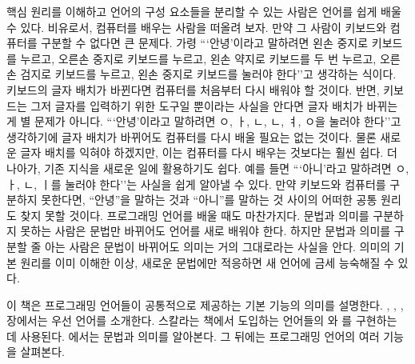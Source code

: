 핵심 원리를 이해하고 언어의 구성 요소들을 분리할 수 있는 사람은 언어를 쉽게 배울
수 있다. 비유로서, 컴퓨터를 배우는 사람을 떠올려 보자. 만약 그 사람이 키보드와
컴퓨터를 구분할 수 없다면 큰 문제다. 가령 ```안녕'이라고 말하려면 왼손 중지로
키보드를 누르고, 오른손 중지로 키보드를 누르고, 왼손 약지로 키보드를 두 번
누르고, 오른손 검지로 키보드를 누르고, 왼손 중지로 키보드를 눌러야 한다''고
생각하는 식이다. 키보드의 글자 배치가 바뀐다면 컴퓨터를 처음부터 다시 배워야 할
것이다. 반면, 키보드는 그저 글자를 입력하기 위한 도구일 뿐이라는 사실을 안다면
글자 배치가 바뀌는 게 별 문제가 아니다. ```안녕'이라고 말하려면 ㅇ, ㅏ, ㄴ, ㄴ,
ㅕ, ㅇ을 눌러야 한다''고 생각하기에 글자 배치가 바뀌어도 컴퓨터를 다시 배울
필요는 없는 것이다. 물론 새로운 글자 배치를 익혀야 하겠지만, 이는 컴퓨터를 다시
배우는 것보다는 훨씬 쉽다. 더 나아가, 기존 지식을 새로운 일에 활용하기도 쉽다.
예를 들면 ```아니'라고 말하려면 ㅇ, ㅏ, ㄴ, ㅣ를 눌러야 한다''는 사실을 쉽게
알아낼 수 있다. 만약 키보드와 컴퓨터를 구분하지 못한다면, ``안녕''을 말하는 것과
``아니''를 말하는 것 사이의 어떠한 공통 원리도 찾지 못할 것이다. 프로그래밍 언어를
배울 때도 마찬가지다. 문법과 의미를 구분하지 못하는 사람은 문법만 바뀌어도
언어를 새로 배워야 한다. 하지만 문법과 의미를 구분할 줄 아는 사람은 문법이
바뀌어도 의미는 거의 그대로라는 사실을 안다. 의미의 기본 원리를 이미 이해한
이상, 새로운 문법에만 적응하면 새 언어에 금세 능숙해질 수 있다.

이 책은 프로그래밍 언어들이 공통적으로 제공하는 기본 기능의 의미를 설명한다.
, , ,
장에서는 우선  언어를 소개한다. 스칼라는 책에서 도입하는 언어들의
와 를 구현하는 데 사용된다.
에서는 문법과 의미를 알아본다. 그 뒤에는 프로그래밍 언어의 여러 기능을
살펴본다.

